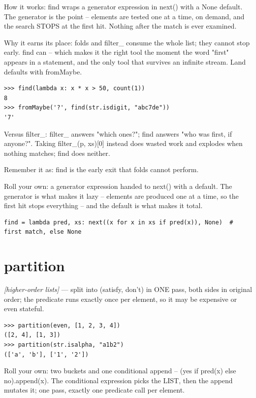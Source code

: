 \documentclass[11pt,letterpaper]{book}
\begin{document}
How it works: find wraps a generator expression in next() with a None default. The generator is the point -- elements are tested one at a time, on demand, and the search STOPS at the first hit. Nothing after the match is ever examined.


Why it earns its place: folds and filter\_ consume the whole list; they cannot stop early. find can -- which makes it the right tool the moment the word "first" appears in a statement, and the only tool that survives an infinite stream. Land defaults with fromMaybe.

\begin{lstlisting}[style=spec]
>>> find(lambda x: x * x > 50, count(1))
8
>>> fromMaybe('?', find(str.isdigit, "abc7de"))
'7'
\end{lstlisting}

Versus filter\_: filter\_ answers "which ones?"; find answers "who was first, if anyone?". Taking filter\_(p, xs)[0] instead does wasted work and explodes when nothing matches; find does neither.


Remember it as: find is the early exit that folds cannot perform.


Roll your own: a generator expression handed to next() with a default. The generator is what makes it lazy -- elements are produced one at a time, so the first hit stops everything -- and the default is what makes it total.

\begin{lstlisting}[style=code]
find = lambda pred, xs: next((x for x in xs if pred(x)), None)  # first match, else None
\end{lstlisting}

\section{partition}
\noindent\textit{[higher-order lists]} --- split into (satisfy, don't) in ONE pass, both sides in original order; the predicate runs exactly once per element, so it may be expensive or even stateful.
\begin{lstlisting}[style=spec]
>>> partition(even, [1, 2, 3, 4])
([2, 4], [1, 3])
>>> partition(str.isalpha, "a1b2")
(['a', 'b'], ['1', '2'])
\end{lstlisting}

Roll your own: two buckets and one conditional append -- (yes if pred(x) else no).append(x). The conditional expression picks the LIST, then the append mutates it; one pass, exactly one predicate call per element.
\end{document}
